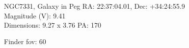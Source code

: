 \begin{block}{NGC7331, Galaxy in Peg}
    RA: 22:37:04.01, Dec: +34:24:55.9 \\ 
    Magnitude (V): 9.41 \\ 
    Dimensions: 9.27 x 3.76 PA: 170 

    Finder fov: 60 
\end{block}